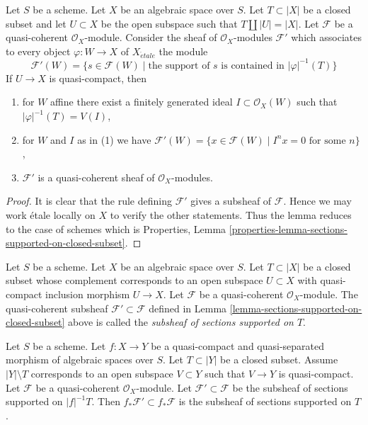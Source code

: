 \begin{lemma}
\label{lemma-sections-supported-on-closed-subset}
Let $S$ be a scheme. Let $X$ be an algebraic space over $S$.
Let $T \subset |X|$ be a closed subset and let $U \subset X$ be
the open subspace such that $T \amalg |U| = |X|$.
Let $\mathcal{F}$ be a quasi-coherent $\mathcal{O}_X$-module.
Consider the sheaf of $\mathcal{O}_X$-modules $\mathcal{F}'$
which associates to every object $\varphi : W \to X$ of
$X_{\acute{e}tale}$ the module
$$
\mathcal{F}'(W)
=
\{s \in \mathcal{F}(W) \mid
\text{the support of }s\text{ is contained in }|\varphi|^{-1}(T)\}
$$
If $U \to X$ is quasi-compact, then
\begin{enumerate}
\item for $W$ affine there exist a finitely generated
ideal $I \subset \mathcal{O}_X(W)$ such that $|\varphi|^{-1}(T) = V(I)$,
\item for $W$ and $I$ as in (1) we have
$\mathcal{F}'(W) = \{x \in \mathcal{F}(W) \mid
I^nx = 0 \text{ for some } n\}$,
\item $\mathcal{F}'$ is a quasi-coherent sheaf of $\mathcal{O}_X$-modules.
\end{enumerate}
\end{lemma}

\begin{proof}
It is clear that the rule defining $\mathcal{F}'$ gives a subsheaf
of $\mathcal{F}$. Hence we may work \'etale locally on $X$ to verify
the other statements. Thus the lemma reduces to the case of schemes
which is
Properties, Lemma \ref{properties-lemma-sections-supported-on-closed-subset}.
\end{proof}

\begin{definition}
\label{definition-subsheaf-sections-supported-on-closed}
Let $S$ be a scheme. Let $X$ be an algebraic space over $S$.
Let $T \subset |X|$ be a closed subset whose complement
corresponds to an open subspace $U \subset X$
with quasi-compact inclusion morphism $U \to X$.
Let $\mathcal{F}$ be a quasi-coherent $\mathcal{O}_X$-module.
The quasi-coherent subsheaf $\mathcal{F}' \subset \mathcal{F}$ defined in
Lemma \ref{lemma-sections-supported-on-closed-subset} above is called
the {\it subsheaf of sections supported on $T$}.
\end{definition}

\begin{lemma}
\label{lemma-push-sections-supported-on-closed-subset}
Let $S$ be a scheme.
Let $f : X \to Y$ be a quasi-compact and quasi-separated morphism
of algebraic spaces over $S$. Let $T \subset |Y|$ be a closed subset.
Assume $|Y| \setminus T$ corresponds to an open subspace $V \subset Y$
such that $V \to Y$ is quasi-compact. Let $\mathcal{F}$ be a quasi-coherent
$\mathcal{O}_X$-module. Let $\mathcal{F}' \subset \mathcal{F}$
be the subsheaf of sections supported on $|f|^{-1}T$.
Then $f_*\mathcal{F}' \subset f_*\mathcal{F}$ is the subsheaf
of sections supported on $T$.
\end{lemma}

